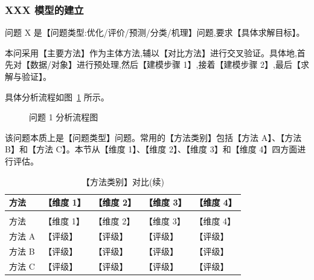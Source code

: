 
\subsubsection{XXX 模型的建立}


问题 X 是【问题类型:优化/评价/预测/分类/机理】问题,要求【具体求解目标】。

本问采用【主要方法】作为主体方法,辅以【对比方法】进行交叉验证。具体地,首先对【数据/对象】进行预处理,然后【建模步骤 1】,接着【建模步骤 2】,最后【求解与验证】。

具体分析流程如图~\ref{fig:q1_analysis_flow} 所示。

\begin{figure}[ht]
  \begin{center}
    \caption{问题 1 分析流程图}
    \label{fig:q1_analysis_flow}
  \end{center}
\end{figure}

该问题本质上是【问题类型】问题。常用的【方法类别】包括【方法 A】、【方法 B】和【方法 C】。本节从【维度 1】、【维度 2】、【维度 3】和【维度 4】四方面进行评估。

\begin{longtable}{>{\centering\arraybackslash}p{}>{\centering\arraybackslash}p{}>{\centering\arraybackslash}p{}>{\centering\arraybackslash}p{}>{\centering\arraybackslash}p{}}
  \caption{【方法类别】对比}\\
  \toprule
  方法 & 【维度 1】 & 【维度 2】 & 【维度 3】 & 【维度 4】 \\
  \midrule
  \endfirsthead
  \caption{【方法类别】对比(续)}\\
  \toprule
  方法 & 【维度 1】 & 【维度 2】 & 【维度 3】 & 【维度 4】 \\
  \midrule
  \endhead
  \bottomrule
  \endfoot
  方法 A & 【评级】 & 【评级】 & 【评级】 & 【评级】 \\
  方法 B & 【评级】 & 【评级】 & 【评级】 & 【评级】 \\
  方法 C & 【评级】 & 【评级】 & 【评级】 & 【评级】 \\
\end{longtable}

